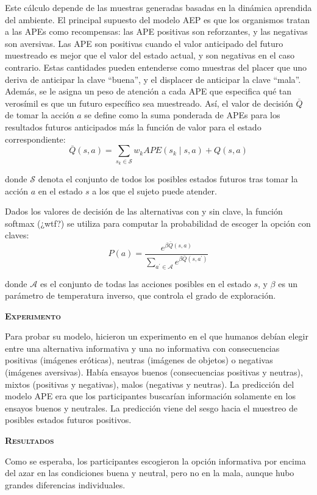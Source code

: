 \documentclass[a4paper,12pt]{article}
\begin{document}
Este cálculo depende de las muestras generadas basadas en la dinámica aprendida del ambiente. El principal supuesto del modelo AEP es que los organismos tratan a las APEs como recompensas: las APE positivas son reforzantes, y las negativas son aversivas. Las APE son positivas cuando el valor anticipado del futuro muestreado es mejor que el valor del estado actual, y son negativas en el caso contrario. Estas cantidades pueden entenderse como muestras del placer que uno deriva de anticipar la clave ``buena'', y el displacer de anticipar la clave ``mala''. Además, se le asigna un peso de atención a cada APE que especifica qué tan verosímil es que un futuro específico sea muestreado. Así, el valor de decisión $\bar Q$ de tomar la acción $a$ se define como la suma ponderada de APEs para los resultados futuros anticipados más la función de valor para el estado correspondiente:
$$
\bar{Q}(s, a)=\sum_{s_{k} \in \mathcal{S}} w_{k} A P E\left(s_{k} \mid s, a\right)+Q(s, a)
$$

donde $\mathcal{S}$ denota el conjunto de todos los posibles estados futuros tras tomar la acción $a$ en el estado $s$ a los que el sujeto puede atender.

Dados los valores de decisión de las alternativas con y sin clave, la función softmax (¿wtf?) se utiliza para computar la probabilidad de escoger la opción con claves:
$$
P(a)=\frac{e^{\beta \bar{Q}(s, a)}}{\sum_{a^{\prime} \in \mathcal{A}} e^{\beta \bar{Q}\left(s, a^{\prime}\right)}}
$$

donde $\mathcal{A}$ es el conjunto de todas las acciones posibles en el estado $s$, y $\beta$ es un parámetro de temperatura inverso, que controla el grado de exploración.

{\scshape\bfseries Experimento}

Para probar su modelo, hicieron un experimento en el que humanos debían elegir entre una alternativa informativa y una no informativa con consecuencias positivas (imágenes eróticas), neutras (imágenes de objetos) o negativas (imágenes aversivas). Había ensayos buenos (consecuencias positivas y neutras), mixtos (positivas y negativas), malos (negativas y neutras). La predicción del modelo APE era que los participantes buscarían información solamente en los ensayos buenos y neutrales. La predicción viene del sesgo hacia el muestreo de posibles estados futuros positivos.

{\scshape\bfseries Resultados}
\nopagebreak

Como se esperaba, los participantes escogieron la opción informativa por encima del azar en las condiciones buena y neutral, pero no en la mala, aunque hubo grandes diferencias individuales.
\end{document}
